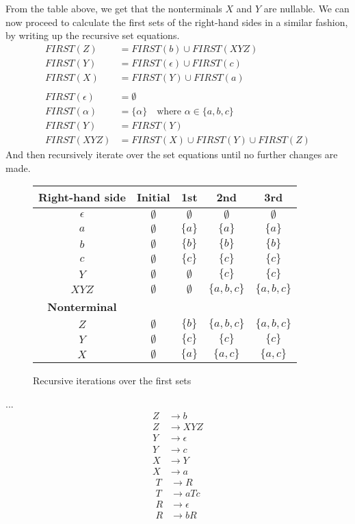 \documentclass[11pt,a4paper]{article}
\let\imp\to
\begin{document}
From the table above, we get that the nonterminals $X$ and $Y$ are nullable.
\newpage
We can now proceed to calculate the first sets of the right-hand sides in a
similar fashion, by writing up the recursive set equations.
\begin{align*}
	FIRST(Z) &= FIRST(b) \cup FIRST(XYZ) \\
	FIRST(Y) &= FIRST(\epsilon) \cup FIRST(c) \\
	FIRST(X) &= FIRST(Y) \cup FIRST(a) \\\\
	FIRST(\epsilon) &= \emptyset \\
	FIRST(\alpha) &= \{\alpha\} \quad \text{where $\alpha \in \{a, b, c\}$} \\
	FIRST(Y) &= FIRST(Y) \\
	FIRST(XYZ) &= FIRST(X) \cup FIRST(Y) \cup FIRST(Z)
\end{align*}
And then recursively iterate over the set equations until no further changes
are made.
\begin{figure}[H]
	\center
	\begin{tabular}{c|cccc}
		{\bf Right-hand side} & {\bf Initial} & {\bf 1st} & {\bf 2nd} & {\bf 3rd} \\ \hline
		$\epsilon$ 	& $\emptyset$ & $\emptyset$ & $\emptyset$ & $\emptyset$ \\
		$a$ 		& $\emptyset$ & $\{a\}$ & $\{a\}$ & $\{a\}$ \\
		$b$ 		& $\emptyset$ & $\{b\}$ & $\{b\}$ & $\{b\}$ \\
		$c$ 		& $\emptyset$ & $\{c\}$ & $\{c\}$ & $\{c\}$ \\
		$Y$ 		& $\emptyset$ & $\emptyset$ & $\{c\}$ & $\{c\}$ \\
		$XYZ$ 		& $\emptyset$ & $\emptyset$ & $\{a,b,c\}$ & $\{a,b,c\}$ \\ \hline
		{\bf Nonterminal} & {\ } & {\ } \\ \hline
		$Z$ 		& $\emptyset$ & $\{b\}$ & $\{a,b,c\}$ & $\{a,b,c\}$ \\
		$Y$ 		& $\emptyset$ & $\{c\}$ & $\{c\}$ & $\{c\}$ \\
		$X$ 		& $\emptyset$ & $\{a\}$ & $\{a,c\}$ & $\{a,c\}$ \\
	\end{tabular}
	\label{table:first-sets}
	\caption{Recursive iterations over the first sets}
\end{figure}
...
\begin{align*}
	Z &\imp b \\
	Z &\imp X Y Z \\
	Y &\imp \epsilon \\
	Y &\imp c \\
	X &\imp Y \\
	X &\imp a
\end{align*}
\begin{align*}
	T &\imp R \\
	T &\imp aTc \\
	R &\imp \epsilon \\
	R &\imp bR
\end{align*}
\end{document}
